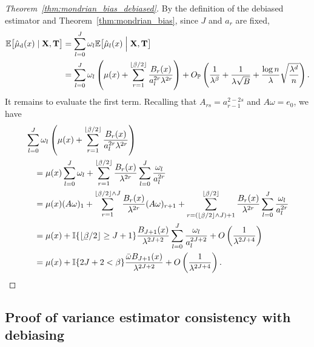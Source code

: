 \begin{proof}[Theorem~\ref{thm:mondrian_bias_debiased}]

  By the definition of the debiased estimator and
  Theorem~\ref{thm:mondrian_bias}, since $J$ and $a_r$ are fixed,
  \begin{align*}
    \E \big[ \hat \mu_\rd(x) \mid \bX, \bT \big]
    &=
    \sum_{l=0}^J
    \omega_l
    \E \big[
      \hat \mu_l(x)
      \Bigm| \bX, \bT
    \big] \\
    &=
    \sum_{l=0}^J
    \omega_l
    \left(
      \mu(x)
      + \sum_{r=1}^{\lfloor \flbeta / 2 \rfloor}
      \frac{B_r(x)}{a_l^{2r} \lambda^{2r}}
    \right)
    + O_\P \left(
      \frac{1}{\lambda^\beta}
      + \frac{1}{\lambda \sqrt B}
      + \frac{\log n}{\lambda} \sqrt{\frac{\lambda^d}{n}}
    \right).
  \end{align*}
  It remains to evaluate the first term.
  Recalling that $A_{r s} = a_{r-1}^{2 - 2s}$
  and $A \omega = e_0$, we have
  \begin{align*}
    &\sum_{l=0}^J
    \omega_l
    \left(
      \mu(x)
      + \sum_{r=1}^{\lfloor \flbeta / 2 \rfloor}
      \frac{B_r(x)}{a_l^{2r} \lambda^{2r}}
    \right) \\
    &\quad=
    \mu(x)
    \sum_{l=0}^J
    \omega_l
    +
    \sum_{r=1}^{\lfloor \flbeta / 2 \rfloor}
    \frac{B_r(x)}{\lambda^{2r}}
    \sum_{l=0}^J
    \frac{\omega_l}{a_l^{2r}} \\
    &\quad=
    \mu(x)
    (A \omega)_1
    + \sum_{r=1}^{\lfloor \flbeta / 2 \rfloor \wedge J}
    \frac{B_r(x)}{\lambda^{2r}}
    (A \omega)_{r+1}
    + \sum_{r = (\lfloor \flbeta / 2 \rfloor \wedge J) + 1}
    ^{\lfloor \flbeta / 2 \rfloor}
    \frac{B_r(x)}{\lambda^{2r}}
    \sum_{l=0}^J
    \frac{\omega_l}{a_l^{2r}} \\
    &\quad=
    \mu(x)
    + \I\{\lfloor \flbeta / 2 \rfloor \geq J + 1\}
    \frac{B_{J+1}(x)}{\lambda^{2J + 2}}
    \sum_{l=0}^J
    \frac{\omega_l}{a_l^{2J + 2}}
    + O \left( \frac{1}{\lambda^{2J + 4}} \right) \\
    &\quad=
    \mu(x)
    + \I\{2J + 2 < \beta\}
    \frac{\bar\omega B_{J+1}(x)}{\lambda^{2J + 2}}
    + O \left( \frac{1}{\lambda^{2J + 4}} \right).
  \end{align*}
\end{proof}

\subsection*{Proof of variance estimator consistency with debiasing}

